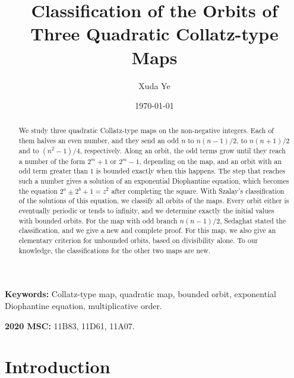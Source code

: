 \documentclass{article}
\title{Classification of the Orbits of Three Quadratic Collatz-type Maps}
\author{Xuda Ye}
\affil{Department of Mathematics, Purdue University, West Lafayette, IN 47907}
\date{\today}
\begin{document}
\maketitle

\begin{abstract}
We study three quadratic Collatz-type maps on the non-negative integers. Each of them halves an even number, and they send an odd $n$ to $n(n-1)/2$, to $n(n+1)/2$ and to $(n^2 - 1)/4$, respectively.  Along an orbit, the odd terms grow until they reach a number of the form $2^m + 1$ or $2^m - 1$, depending on the map, and an orbit with an odd term greater than $1$ is bounded exactly when this happens. The step that reaches such a number gives a solution of an exponential Diophantine equation, which becomes the equation $2^a \pm 2^b + 1 = z^2$ after completing the square. With Szalay's classification of the solutions of this equation, we classify all orbits of the maps. Every orbit either is eventually periodic or tends to infinity, and we determine exactly the initial values with bounded orbits. For the map with odd branch $n(n-1)/2$, Sedaghat stated the classification, and we give a new and complete proof. For this map, we also give an elementary criterion for unbounded orbits, based on divisibility alone. To our knowledge, the classifications for the other two maps are new.
\end{abstract}

\textbf{Keywords:} Collatz-type map, quadratic map, bounded orbit, exponential Diophantine equation, multiplicative order.

\textbf{2020 MSC:} 11B83, 11D61, 11A07.

\section{Introduction}
\label{sec: intro}
\end{document}
